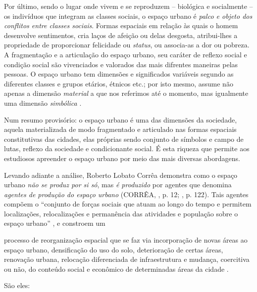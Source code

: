 Por último, sendo o lugar onde vivem e se reproduzem -- biológica e socialmente -- os indivíduos que integram as classes sociais, o espaço urbano é \textit{palco e objeto dos conflitos entre classes sociais}. Formas espaciais em relação às quais o homem desenvolve sentimentos, cria laços de afeição ou delas desgosta, atribui-lhes a propriedade de proporcionar felicidade ou \textit{status}, ou associa-as a dor ou pobreza. A fragmentação e a articulação do espaço urbano, seu caráter de reflexo social e condição social são vivenciados e valorados das mais difrentes maneiras pelas pessoas. O espaço urbano tem dimensões e significados variáveis segundo as diferentes classes e grupos etários, étnicos etc.; por isto mesmo, assume não apenas a dimensão \textit{material} a que nos referimos até o momento, mas igualmente uma dimensão \textit{simbólica} \cite[p.~150-151]{CORREA1997}.

Num resumo provisório: o espaço urbano é uma das dimensões da sociedade, aquela materializada de modo fragmentado e articulado nas formas espaciais constitutivas das cidades, elas próprias sendo conjunto de símbolos e campo de lutas, reflexo da sociedade e condicionante social. É esta riqueza que permite aos estudiosos apreender o espaço urbano por meio das mais diversas abordagens.

Levando adiante a análise, Roberto Lobato Corrêa demonstra como o espaço urbano \textit{não se produz por si só}, mas \textit{é produzido} por agentes que denomina \textit{agentes de produção do espaço urbano} (CORRÊA, \citeyear{CORREA1985espa}, p. 12; \citeyear{CORREA1997}, p. 122). Tais agentes compõem o ``conjunto de forças sociais que atuam ao longo do tempo e permitem localizações, relocalizações e permanência das atividades e população sobre o espaço urbano'' \cite[p.~122]{CORREA1997}, e constroem um

\begin{citacao}
processo de reorganização espacial que se faz via incorporação de novas áreas ao espaço urbano, densificação do uso do solo, deterioração de certas áreas, renovação urbana, relocação diferenciada de infraestrutura e mudança, coercitiva ou não, do conteúdo social e econômico de determinadas áreas da cidade \cite[p.~11]{CORREA1985espa}.
\end{citacao}

São eles:

